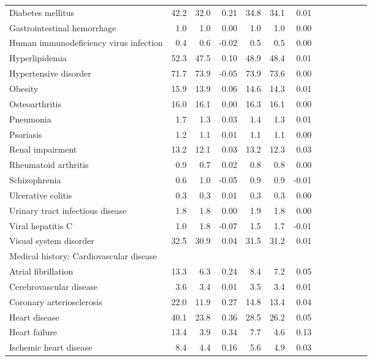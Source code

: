 \documentclass[11pt,]{article}
\begin{document}
\begin{longtable}{lrrrrrrrrrrrr}
      Diabetes mellitus & 42.2 & 32.0 &  0.21 & 34.8 & 34.1 &  0.01 \\ 
      Gastrointestinal hemorrhage &  1.0 &  1.0 &  0.00 &  1.0 &  1.0 &  0.00 \\ 
      Human immunodeficiency virus infection &  0.4 &  0.6 & -0.02 &  0.5 &  0.5 &  0.00 \\ 
      Hyperlipidemia & 52.3 & 47.5 &  0.10 & 48.9 & 48.4 &  0.01 \\ 
      Hypertensive disorder & 71.7 & 73.9 & -0.05 & 73.9 & 73.6 &  0.00 \\ 
      Obesity & 15.9 & 13.9 &  0.06 & 14.6 & 14.3 &  0.01 \\ 
      Osteoarthritis & 16.0 & 16.1 &  0.00 & 16.3 & 16.1 &  0.00 \\ 
      Pneumonia &  1.7 &  1.3 &  0.03 &  1.4 &  1.3 &  0.01 \\ 
      Psoriasis &  1.2 &  1.1 &  0.01 &  1.1 &  1.1 &  0.00 \\ 
      Renal impairment & 13.2 & 12.1 &  0.03 & 13.2 & 12.3 &  0.03 \\ 
      Rheumatoid arthritis &  0.9 &  0.7 &  0.02 &  0.8 &  0.8 &  0.00 \\ 
      Schizophrenia &  0.6 &  1.0 & -0.05 &  0.9 &  0.9 & -0.01 \\ 
      Ulcerative colitis &  0.3 &  0.3 &  0.01 &  0.3 &  0.3 &  0.00 \\ 
      Urinary tract infectious disease &  1.8 &  1.8 &  0.00 &  1.9 &  1.8 &  0.00 \\ 
      Viral hepatitis C &  1.0 &  1.8 & -0.07 &  1.5 &  1.7 & -0.01 \\ 
      Visual system disorder & 32.5 & 30.9 &  0.04 & 31.5 & 31.2 &  0.01 \\ 
  Medical history: Cardiovascular disease &    &    &     &    &    &     \\ 
      Atrial fibrillation & 13.3 &  6.3 &  0.24 &  8.4 &  7.2 &  0.05 \\ 
      Cerebrovascular disease &  3.6 &  3.4 &  0.01 &  3.5 &  3.4 &  0.01 \\ 
      Coronary arteriosclerosis & 22.0 & 11.9 &  0.27 & 14.8 & 13.4 &  0.04 \\ 
      Heart disease & 40.1 & 23.8 &  0.36 & 28.5 & 26.2 &  0.05 \\ 
      Heart failure & 13.4 &  3.9 &  0.34 &  7.7 &  4.6 &  0.13 \\ 
      Ischemic heart disease &  8.4 &  4.4 &  0.16 &  5.6 &  4.9 &  0.03 \\ 

\end{longtable}
\end{document}
